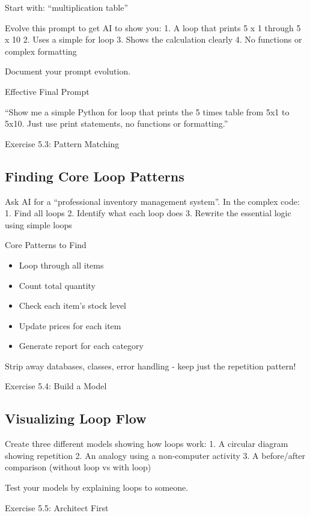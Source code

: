 \documentclass[
  letterpaper,
  DIV=11,
  numbers=noendperiod,
  oneside]{scrreprt}
\providecommand{\tightlist}{%
  \setlength{\itemsep}{0pt}\setlength{\parskip}{0pt}}\usepackage{longtable,booktabs,array}
\begin{document}
Start with: ``multiplication table''

Evolve this prompt to get AI to show you: 1. A loop that prints 5 x 1
through 5 x 10 2. Uses a simple for loop 3. Shows the calculation
clearly 4. No functions or complex formatting

Document your prompt evolution.

Effective Final Prompt

``Show me a simple Python for loop that prints the 5 times table from
5x1 to 5x10. Just use print statements, no functions or formatting.''

Exercise 5.3: Pattern Matching

\subsection{Finding Core Loop
Patterns}\label{finding-core-loop-patterns}

Ask AI for a ``professional inventory management system''. In the
complex code: 1. Find all loops 2. Identify what each loop does 3.
Rewrite the essential logic using simple loops

Core Patterns to Find

\begin{itemize}
\tightlist
\item
  Loop through all items
\item
  Count total quantity
\item
  Check each item's stock level
\item
  Update prices for each item
\item
  Generate report for each category
\end{itemize}

Strip away databases, classes, error handling - keep just the repetition
pattern!

Exercise 5.4: Build a Model

\subsection{Visualizing Loop Flow}\label{visualizing-loop-flow}

Create three different models showing how loops work: 1. A circular
diagram showing repetition 2. An analogy using a non-computer activity
3. A before/after comparison (without loop vs with loop)

Test your models by explaining loops to someone.

Exercise 5.5: Architect First
\end{document}

